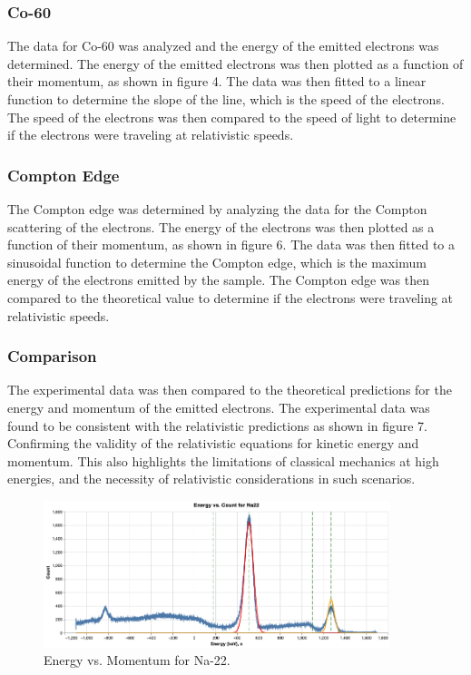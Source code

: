 \documentclass[12pt]{article}
\begin{document}
                \subsubsection{Co-60}
                The data for Co-60 was analyzed and the energy of the emitted electrons was determined. 
                The energy of the emitted electrons was then plotted as a function of their momentum, 
                as shown in figure 4. The data was then fitted to a linear function to determine the slope 
                of the line, which is the speed of the electrons. The speed of the electrons was then compared 
                to the speed of light to determine if the electrons were traveling at relativistic speeds.

                \subsubsection{Compton Edge}
                The Compton edge was determined by analyzing the data for the Compton scattering of the electrons. 
                The energy of the electrons was then plotted as a function of their momentum, as shown in figure 6. 
                The data was then fitted to a sinusoidal function to determine the Compton edge, which is the maximum 
                energy of the electrons emitted by the sample. The Compton edge was then compared to the theoretical 
                value to determine if the electrons were traveling at relativistic speeds.

                \subsubsection{Comparison}
                The experimental data was then compared to the theoretical predictions for the energy and momentum of the 
                emitted electrons. The experimental data was found to be consistent with the relativistic predictions as shown in figure 7. 
                Confirming the validity of the relativistic equations for kinetic energy and momentum. This also highlights 
                the limitations of classical mechanics at high energies, and the necessity of relativistic considerations in such scenarios.
        



        \begin{figure}[h!]
                \centering
                \includegraphics[width=0.9\textwidth]{./img/plots/graph2.png}
                \caption{Energy vs. Momentum for Na-22.}
        \end{figure}
\end{document}
